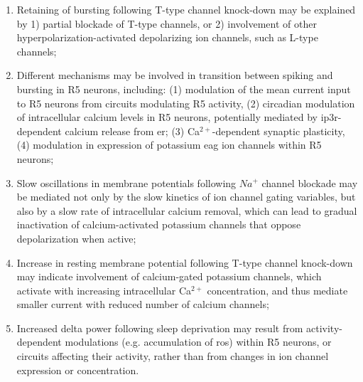 \documentclass[../main.tex]{subfiles}
\begin{document}
\begin{enumerate}
    \item Retaining of bursting following T-type channel knock-down may be explained by 1) partial blockade of T-type channels, or 2) involvement of other hyperpolarization-activated depolarizing ion channels, such as L-type channels;
    
    \item Different mechanisms may be involved in transition between spiking and bursting in R5 neurons, including: (1) modulation of the mean current input to R5 neurons from circuits modulating R5 activity, (2) circadian modulation of intracellular calcium levels in R5 neurons, potentially mediated by \gls{ip3r}-dependent calcium release from \gls{er}; (3) Ca$^{2+}$-dependent synaptic plasticity, (4) modulation in expression of potassium \gls{eag} ion channels within R5 neurons;
    
    \item Slow oscillations in membrane potentials following $Na^+$ channel blockade may be mediated not only by the slow kinetics of ion channel gating variables, but also by a slow rate of intracellular calcium removal, which can lead to gradual inactivation of calcium-activated potassium channels that oppose depolarization when active;

    \item Increase in resting membrane potential following T-type channel knock-down may indicate involvement of calcium-gated potassium channels, which activate with increasing intracellular Ca$^{2+}$ concentration, and thus mediate smaller current with reduced number of calcium channels;
    
    \item Increased delta power following sleep deprivation may result from activity-dependent modulations (e.g. accumulation of \gls{ros}) within R5 neurons, or circuits affecting their activity, rather than from changes in ion channel expression or concentration.
    
    
\end{enumerate}
\end{document}
